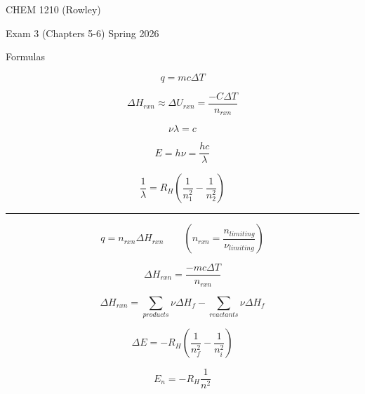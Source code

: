 \documentclass[12pt, addpoints, letterpaper]{exam}
\begin{document}
\begin{center}
	\vspace{12em}
	{\Huge CHEM 1210 (Rowley) }

	{\LARGE Exam 3 (Chapters 5-6) Spring 2026}
\end{center}


\begin{center}
	{\large Formulas}

	\hrulefill
\end{center}

\noindent
\begin{minipage}[c][\stretch{1}][c]{0.495\linewidth}
	\begin{equation*}
		q=mc\Delta T
	\end{equation*}

	\begin{equation*}
		\Delta H_{rxn} \approx \Delta U_{rxn}	= \frac{-C\Delta T}{n_{rxn}}
	\end{equation*}

	\begin{equation*}
		\nu\lambda=c
	\end{equation*}

	\begin{equation*}
		E=h\nu=\frac{hc}{\lambda}
	\end{equation*}

	\begin{equation*}
		\frac{1}{\lambda} = R_H\left(\frac{1}{n_1^2}-\frac{1}{n_2^2}\right)
	\end{equation*}
\end{minipage}
\rule[-135pt]{1.5pt}{270pt}
\begin{minipage}[c][\stretch{1}][c]{0.495\linewidth}
	\begin{equation*}
		q=n_{rxn}\Delta H_{rxn} \hspace{2em} \left(n_{rxn}=\frac{n_{limiting}}{\nu_{limiting}}\right)
	\end{equation*}

	\begin{equation*}
		\Delta H_{rxn}	= \frac{-mc\Delta T}{n_{rxn}}
	\end{equation*}

	\begin{equation*}
		\Delta H_{rxn} = \sum\limits_{products}\nu\Delta H_{f}-\sum\limits_{reactants}\nu\Delta H_{f}
	\end{equation*}

	\begin{equation*}
		\Delta E = -R_H\left(\frac{1}{n_f^2}-\frac{1}{n_i^2}\right)
	\end{equation*}

	\begin{equation*}
		E_n = -R_H\frac{1}{n^2}
	\end{equation*}
\end{minipage}
\end{document}
